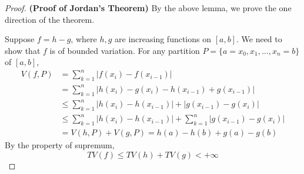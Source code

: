 \documentclass[lang=en, 12pt]{elegantbook}
\begin{document}
        \begin{proof}\textbf{(Proof of Jordan's Theorem)}
            By the above lemma, we prove the one direction of the theorem. \par
            Suppose $f = h - g $, where $h, g$ are increasing functions on $[a,b]$. We need to show that $f$ is of bounded variation.
        For any partition $P= \{a=x_0, x_1, \dots, x_n = b\}$ of $[a,b]$, 
        \begin{equation*}
            \begin{aligned}
                V(f, P) &=\sum_{k=1}^{n} |f(x_i) -f(x_{i-1})|\\
                &= \sum_{k=1}^{n} |h(x_i) - g(x_i) -h(x_{i-1})+g(x_{i-1})|\\
                &\leq \sum_{k=1}^{n} |h(x_i) -h(x_{i-1})|+|g(x_{i-1})- g(x_i)|\\ 
                &\leq \sum_{k=1}^{n} |h(x_i) -h(x_{i-1})|+\sum_{k=1}^{n}|g(x_{i-1})- g(x_i)|\\
                &= V(h,P) +V(g, P) = h(a)-h(b) +g(a) -g(b)
            \end{aligned}
        \end{equation*}
        By the property of supremum, 
        $$TV(f) \leq TV(h) + TV(g) < +\infty$$
        \end{proof}
\end{document}
